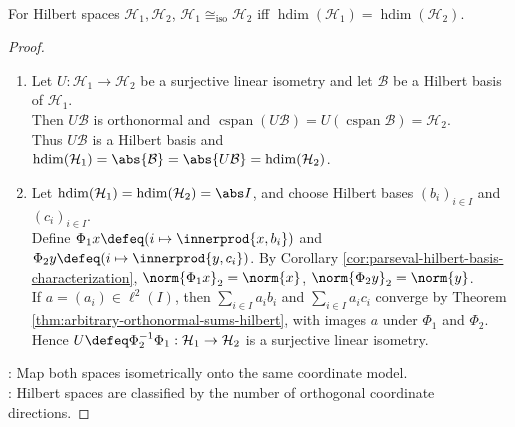 \begin{corollary} \label{cor:hilbert-spaces-classified-by-dimension} \\
For Hilbert spaces $\mathcal{H}_1,\mathcal{H}_2$, $\mathcal{H}_1\cong_{\mathrm{iso}}\mathcal{H}_2$ iff $\operatorname{hdim}(\mathcal{H}_1)=\operatorname{hdim}(\mathcal{H}_2)$.
\begin{proof}
\begin{enumerate}[label=\roman*.]
\setlength{\itemsep}{0pt}
\item[$(\Rightarrow)$] Let $U:\mathcal H_1\to\mathcal H_2$ be a surjective linear isometry and let $\mathcal B$ be a Hilbert basis of $\mathcal H_1$.\\
Then $U\mathcal B$ is orthonormal and $\operatorname{cspan}(U\mathcal B)=U(\operatorname{cspan}\mathcal B)=\mathcal H_2$.\\
Thus $U\mathcal B$ is a Hilbert basis and $\operatorname{hdim}(\mathcal H_1)=\abs{\mathcal B}=\abs{U\mathcal B}=\operatorname{hdim}(\mathcal H_2)$.
\item[$(\Leftarrow)$] Let $\operatorname{hdim}(\mathcal H_1)=\operatorname{hdim}(\mathcal H_2)=\abs I$, and choose Hilbert bases $(b_i)_{i\in I}$ and $(c_i)_{i\in I}$.\\
Define $\Phi_1x\defeq(i\mapsto\innerprod{x,b_i})$ and $\Phi_2y\defeq(i\mapsto\innerprod{y,c_i})$. By Corollary \ref{cor:parseval-hilbert-basis-characterization}, $\norm{\Phi_1x}_2=\norm{x}$, $\norm{\Phi_2y}_2=\norm{y}$.\\
If $a=(a_i)\in\ell^2(I)$, then $\sum\limits_{i\in I}a_ib_i$ and $\sum\limits_{i\in I}a_ic_i$ converge by Theorem \ref{thm:arbitrary-orthonormal-sums-hilbert}, with images $a$ under $\Phi_1$ and $\Phi_2$.\\
Hence $U\defeq\Phi_2^{-1}\Phi_1:\mathcal H_1\to\mathcal H_2$ is a surjective linear isometry.
\end{enumerate}
: Map both spaces isometrically onto the same coordinate model.\\
: Hilbert spaces are classified by the number of orthogonal coordinate directions.
\end{proof}
\end{corollary}

